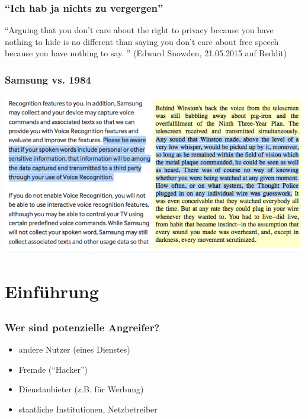 \documentclass[12pt]{beamer}
\begin{document}
\begin{frame}
    \frametitle{``Ich hab ja nichts zu vergergen''}
    \begin{center}
      ``Arguing that you don't care about the right to privacy because you have nothing to hide is no different than saying you don't care about free speech because you have nothing to say. ''
      (Edward Snowden, 21.05.2015 auf Reddit)
    \end{center}
\end{frame}

\begin{frame}
    \frametitle{Samsung vs. 1984}
    \begin{center}
      \includegraphics[height=0.7\textheight]{img/samsung-1984.png}
    \end{center}
\end{frame}

\section{Einführung}
\subsection{}

\begin{frame}
  \frametitle{Wer sind potenzielle Angreifer?}
  \begin{itemize}
    \item<2-> andere Nutzer (eines Dienstes)
    \item<3-> Fremde (``Hacker'')
    \item<4-> Dienstanbieter (z.B. für Werbung)
    \item<5-> staatliche Institutionen, Netzbetreiber
  \end{itemize}
\end{frame}
\end{document}
